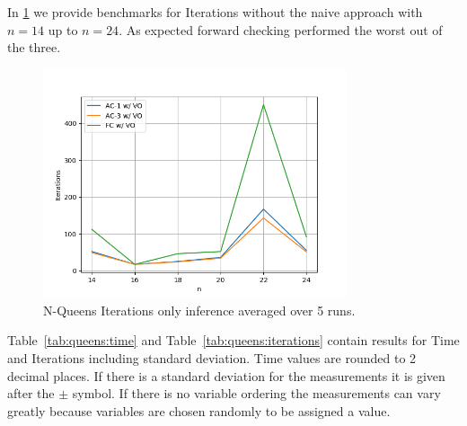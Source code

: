 In \cref{fig:queens:iterations-inference} we provide benchmarks for Iterations without the naive approach with $n = 14$ up to $n = 24$. As expected forward checking performed the worst out of the three.

\begin{figure}[ht]
	\centering
	\includegraphics[width=0.8\textwidth]{./Problems/queens/plots/iterations_inference.png}
	\caption{N-Queens Iterations only inference averaged over 5 runs.}
	\label{fig:queens:iterations-inference}
\end{figure}

Table~\ref{tab:queens:time} and Table~\ref{tab:queens:iterations} contain results for Time and Iterations including standard deviation. Time values are rounded to 2 decimal places. If there is a standard deviation for the measurements it is given after the $\pm$ symbol. If there is no variable ordering the measurements can vary greatly because variables are chosen randomly to be assigned a value.

